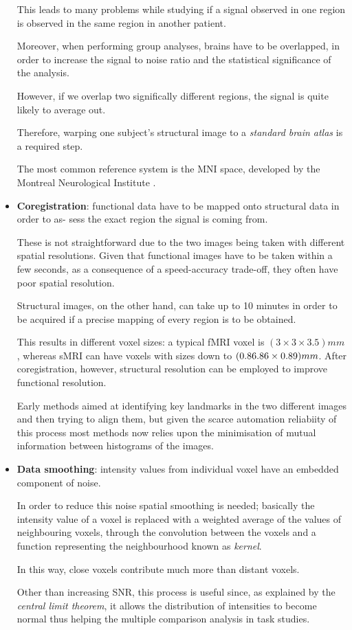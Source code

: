 \documentclass[12pt,openright,twoside,a4paper]{book}
\begin{document}
\begin{itemize}
This leads to many problems while studying if a signal observed in one region is observed in the same region in another patient. 

Moreover, when performing group analyses, brains have to be overlapped, in order to increase the signal to noise ratio and the statistical significance of the analysis. 

However, if we overlap two significally different regions, the signal is quite likely to average out. 

Therefore, warping one subject’s structural image to a \textit{standard brain atlas} is a required step.

The most common reference system is the MNI space, developed by the Montreal Neurological Institute \cite{atlas}.

\item \textbf{Coregistration}: functional data have to be mapped onto structural data in order to as- sess the exact region the signal is coming from. 

These is not straightforward due to the two images being taken with different spatial resolutions. Given that functional images have to be taken within a few seconds, as a consequence of a speed-accuracy trade-off, they often have poor spatial resolution. 

Structural images, on the other hand, can take up to 10 minutes in order to be acquired if a precise mapping of every region is to be obtained.

This results in different voxel sizes: a typical fMRI voxel is $(3\times 3\times 3.5) mm$, whereas sMRI can have voxels with sizes down to $(0.86\time 0.86\times 0.89) mm$. 
After coregistration, however, structural resolution can be employed to improve functional resolution. 

Early methods aimed at identifying key landmarks in the two different images and then trying to align them, but given the scarce automation reliabiity of this process most methods now relies upon the minimisation of mutual information between histograms of the images.

\item \textbf{Data smoothing}: intensity values from individual voxel have an embedded component of noise. 

In order to reduce this noise spatial smoothing is needed; basically the intensity value of a voxel is replaced with a weighted average of the values of neighbouring voxels, through the convolution between the voxels and a function representing the neighbourhood known as \textit{kernel}. 

In this way, close voxels contribute much more than distant voxels. 

Other than increasing SNR, this process is useful since, as explained by the \textit{central limit theorem}, it allows the distribution of intensities to become normal thus helping the multiple comparison analysis in task studies.


\end{itemize}
\end{document}
